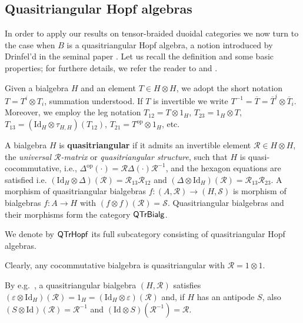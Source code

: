 \documentclass[nosumlimits,twoside]{amsart}
\theoremstyle{definition}
\theoremstyle{remark}
\newcommand{\Rr}{\mathcal{R}}
\newcommand{\Ss}{\mathcal{S}}
\newcommand{\ot}{\otimes}
\def\QTrHopf{{\sf QTrHopf}}
\def\QTrBialg{{\sf QTrBialg}}
\begin{document}
\subsection{Quasitriangular Hopf algebras}

In order to apply our results on tensor-braided duoidal categories we now turn to the case when $B$ is a quasitriangular Hopf algebra, a notion introduced by Drinfel'd in the seminal paper \cite{Dr87}.
Let us recall the definition and some basic properties; for furthere details, we refer the reader to \cite{Kassel} and \cite{Majid-book}.

Given a bialgebra $H$ and an element $T\in H\otimes H$, we adopt the short notation $T=T^{i}\otimes T_{i
}$, summation understood. If $T$ is invertible we write $T^{-1}=\overline{T}=\overline{T}^{i}\otimes\overline{T}_{i}$. Moreover, we employ the leg notation $T_{12}=T\otimes1_{H}$, $T_{23}=1_{H}\otimes T$, $T_{13}=(\mathrm{Id}_{H}\otimes\tau_{H,H})(T_{12})$, $T_{21}=T^{\mathrm{op}}\otimes1_{H}$, etc.

A bialgebra $H$ is \textbf{quasitriangular} if it admits an invertible element $\Rr\in H\otimes H$, the \textit{universal $\Rr$-matrix} or \textit{quasitriangular structure}, such that $H$ is quasi-cocommutative, i.e.,
$\Delta^\mathrm{op}(\cdot)=\Rr\Delta(\cdot)\Rr^{-1}$,
and the hexagon equations are satisfied i.e. $(\mathrm{Id}_H\otimes\Delta)(\Rr)=\Rr_{13}\Rr_{12}$ and $(\Delta\otimes\mathrm{Id}_H)(\Rr)=\Rr_{13}\Rr_{23}$.
A morphism of quasitriangular bialgebras $f:(A,\Rr)\to(H,\Ss)$ is morphism of bialgebras $f:A\to H$ with $(f\ot f)(\Rr)=\Ss$.
Quasitriangular bialgebras and their morphisms form the category $\QTrBialg$.

We denote by  $\QTrHopf$ its full subcategory consisting of quasitriangular Hopf algebras.\medskip


Clearly, any cocommutative bialgebra is quasitriangular with $\mathcal{R}=1\otimes 1$.


By e.g.\ \cite[Theorem VIII.2.4]{Kassel}, a quasitriangular bialgebra $(H,\Rr)$ satisfies $(\varepsilon\otimes\mathrm{Id}_{H})(\Rr)=1_{H}=(\mathrm{Id}_{H}\otimes\varepsilon)(\Rr)$ and, if $H$ has an antipode $S$, also
$(S\otimes\mathrm{Id})(\Rr)=\Rr^{-1}$ and $(\mathrm{Id}\otimes S)(\Rr^{-1})=\Rr.$
\end{document}
